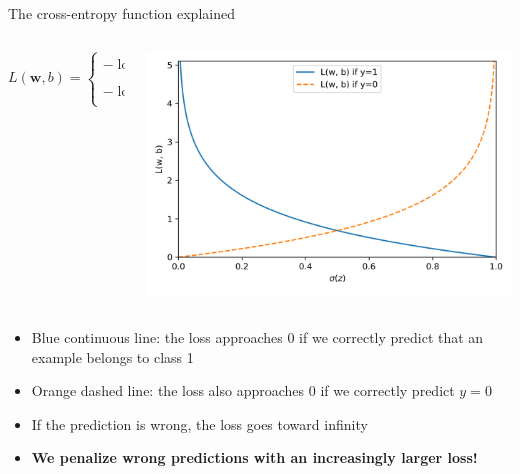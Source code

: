 \documentclass[aspectratio=169]{beamer}
\begin{document}
\begin{frame}{The cross-entropy function explained}
\begin{columns}
	\begin{column}{0.5\textwidth}
		\begin{equation*}
			L(\mathbf{w}, b)  = \begin{cases}
				-\log\left(\sigma(z^{(1)})\right) & \mbox{if } y^{(1)} = 1\\
				-\log\left(1-\sigma(z^{(1)})\right)& \mbox{if } y^{(1)} = 0
			\end{cases}
		\end{equation*}
	\end{column}
	\begin{column}{0.5\textwidth}
			\begin{center}    
		\includegraphics[width=\textwidth]{figures/03_04.png}
	\end{center}
\end{column}
\end{columns}
\begin{itemize}
	\item Blue continuous  line: the loss approaches 0 if we correctly predict that an example belongs to class 1
	\item Orange dashed line: the loss also approaches 0 if we correctly predict $y = 0$
	\item If the prediction is wrong, the loss goes toward infinity
	\item \textbf{We penalize wrong predictions with an increasingly larger loss!}
\end{itemize}
\end{frame}
\end{document}
